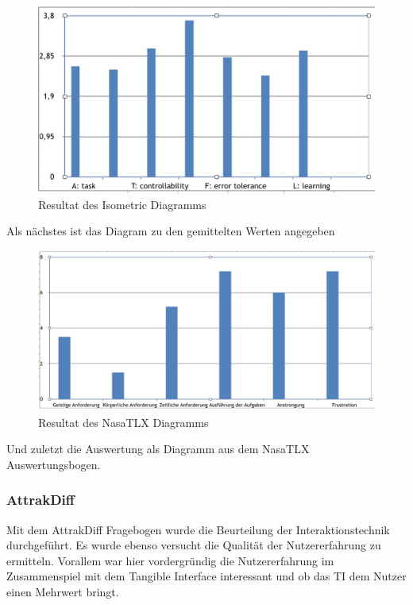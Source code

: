 \documentclass[runningheads,a4paper, 12pt]{llncs}
\begin{document}
\begin{figure}[H]
	\centering
	\includegraphics[angle=0,scale=0.6]{iso_metric_diagram}
	\caption{Resultat des Isometric Diagramms}
	\label{fig:result2}
\end{figure}
Als nächstes ist das Diagram zu den gemittelten Werten angegeben

\begin{figure}[H]
	\centering
	\includegraphics[angle=0,scale=0.4]{nasatlx_diagram}
	\caption{Resultat des NasaTLX Diagramms}
	\label{fig:result3}
\end{figure}
Und zuletzt die Auswertung als Diagramm aus dem NasaTLX Auswertungsbogen.


\subsubsection{AttrakDiff}
Mit dem AttrakDiff Fragebogen wurde die Beurteilung der Interaktionstechnik durchgeführt. Es wurde ebenso versucht die Qualität der Nutzererfahrung zu ermitteln. Vorallem war hier vordergründig die Nutzererfahrung im Zusammenspiel mit dem Tangible Interface interessant und ob das TI dem Nutzer einen Mehrwert bringt.
\end{document}
